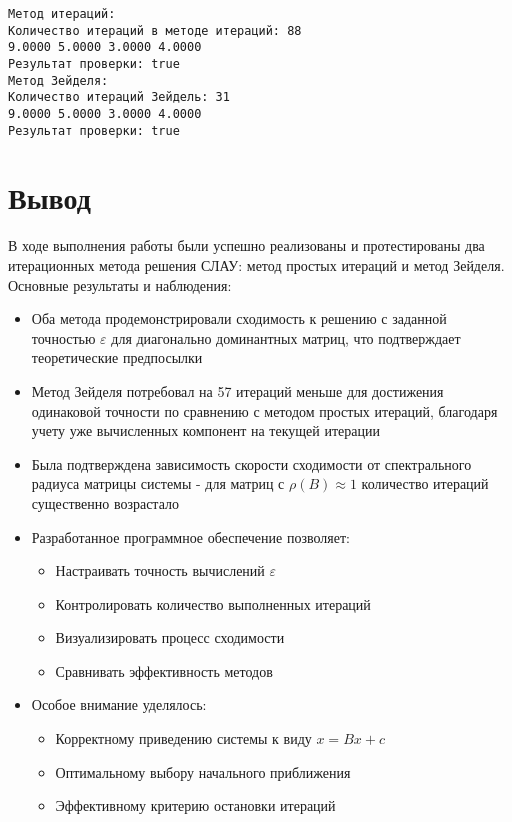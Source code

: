 \begin{verbatim}
Метод итераций:
Количество итераций в методе итераций: 88
9.0000 5.0000 3.0000 4.0000 
Результат проверки: true
Метод Зейделя:
Количество итераций Зейдель: 31
9.0000 5.0000 3.0000 4.0000 
Результат проверки: true
\end{verbatim}

\section*{Вывод}

В ходе выполнения работы были успешно реализованы и протестированы два итерационных метода решения СЛАУ: метод простых итераций и метод Зейделя. Основные результаты и наблюдения:

\begin{itemize}
\item Оба метода продемонстрировали сходимость к решению с заданной точностью $\varepsilon$ для диагонально доминантных матриц, что подтверждает теоретические предпосылки

\item Метод Зейделя потребовал на 57 итераций меньше для достижения одинаковой точности по сравнению с методом простых итераций, благодаря учету уже вычисленных компонент на текущей итерации

\item Была подтверждена зависимость скорости сходимости от спектрального радиуса матрицы системы - для матриц с $\rho(B) \approx 1$ количество итераций существенно возрастало

\item Разработанное программное обеспечение позволяет:
\begin{itemize}
\item Настраивать точность вычислений $\varepsilon$
\item Контролировать количество выполненных итераций
\item Визуализировать процесс сходимости
\item Сравнивать эффективность методов
\end{itemize}

\item Особое внимание уделялось:
\begin{itemize}
\item Корректному приведению системы к виду $x = Bx + c$
\item Оптимальному выбору начального приближения
\item Эффективному критерию остановки итераций
\end{itemize}
\end{itemize}

